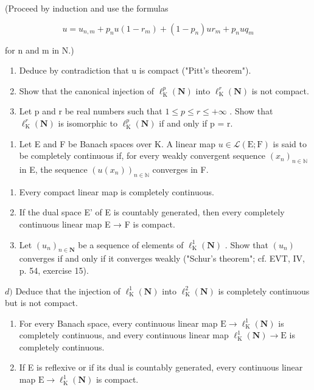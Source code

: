 (Proceed by induction and use the formulas

\[
u = u _ {n, m} + p _ {n} u (1 - r _ {m}) + (1 - p _ {n}) u r _ {m} + p _ {n} u q _ {m}
\]

for n and m in N.)

\begin{enumerate}
\def\labelenumi{\alph{enumi})}
\setcounter{enumi}{2}
\item
  Deduce by contradiction that u is compact ("Pitt's theorem").
\item
  Show that the canonical injection of \(\ell_{\mathrm{K}}^{p}(\mathbf{N})\) into \(\ell_{\mathrm{K}}^{r}(\mathbf{N})\) is not compact.
\item
  Let p and r be real numbers such that \(1 \leqslant p \leqslant r \leqslant +\infty\) . Show that \(\ell_{\mathrm{K}}^{r}(\mathbf{N})\) is isomorphic to \(\ell_{\mathrm{K}}^{p}(\mathbf{N})\) if and only if p = r.
\end{enumerate}

\begin{enumerate}
\def\labelenumi{\arabic{enumi})}
\setcounter{enumi}{10}
\tightlist
\item
  Let E and F be Banach spaces over K. A linear map \(u \in \mathcal{L}(\mathrm{E};\mathrm{F})\) is said to be completely continuous if, for every weakly convergent sequence \((x_{n})_{n \in \mathbb{N}}\) in E, the sequence \((u(x_{n}))_{n \in \mathbb{N}}\) converges in F.
\end{enumerate}

\begin{enumerate}
\def\labelenumi{\alph{enumi})}
\item
  Every compact linear map is completely continuous.
\item
  If the dual space E' of E is countably generated, then every completely continuous linear map E → F is compact.
\item
  Let \((u_{n})_{n\in\mathbf{N}}\) be a sequence of elements of \(\ell_{\mathrm{K}}^{1}(\mathbf{N})\) . Show that \((u_{n})\) converges if and only if it converges weakly ("Schur's theorem"; cf. EVT, IV, p. 54, exercise 15).
\end{enumerate}

\(d)\) Deduce that the injection of \(\ell_{\mathrm{K}}^{1}(\mathbf{N})\) into \(\ell_{\mathrm{K}}^{2}(\mathbf{N})\) is completely continuous but is not compact.

\begin{enumerate}
\def\labelenumi{\alph{enumi})}
\setcounter{enumi}{4}
\item
  For every Banach space, every continuous linear map \(\mathrm{E} \to \ell_{\mathrm{K}}^{1}(\mathbf{N})\) is completely continuous, and every continuous linear map \(\ell_{\mathrm{K}}^{1}(\mathbf{N}) \to \mathrm{E}\) is completely continuous.
\item
  If E is reflexive or if its dual is countably generated, every continuous linear map \(\mathrm{E} \rightarrow \ell_{\mathrm{K}}^{1}(\mathbf{N})\) is compact.
\end{enumerate}

